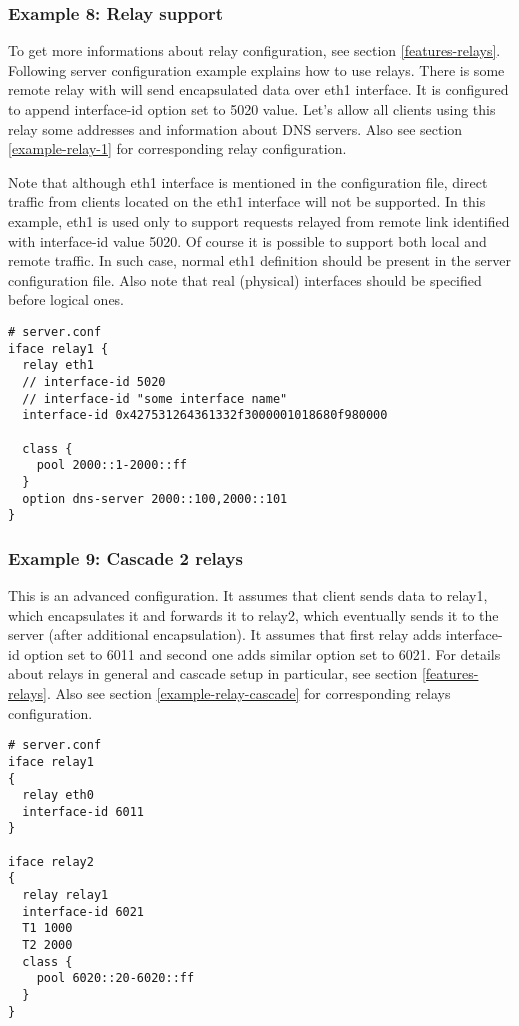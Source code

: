 \subsubsection{Example 8: Relay support}
\label{example-server-relay1}
To get more informations about relay configuration, see section \ref{features-relays}.
Following server configuration example explains how to use
relays. There is some remote relay with will send encapsulated data over
eth1 interface. It is configured to append interface-id option set to
5020 value. Let's allow all clients using this relay some addresses
and information about DNS servers. Also see section
\ref{example-relay-1} for corresponding relay configuration. 

Note that although eth1 interface is mentioned in the configuration file,
direct traffic from clients located on the eth1 interface will not be
supported. In this example, eth1 is used only to support requests
relayed from remote link identified with interface-id value 5020.
Of course it is possible to support both local and remote traffic. In
such case, normal eth1 definition should be present in the server
configuration file. Also note that real (physical) interfaces should
be specified before logical ones.

\begin{lstlisting}
# server.conf
iface relay1 {
  relay eth1
  // interface-id 5020
  // interface-id "some interface name"
  interface-id 0x427531264361332f3000001018680f980000

  class {
    pool 2000::1-2000::ff
  }
  option dns-server 2000::100,2000::101
}
\end{lstlisting}

\subsubsection{Example 9: Cascade 2 relays}
\label{example-server-relay2}
This is an advanced configuration. It assumes that client sends data to
relay1, which encapsulates it and forwards it to relay2, which
eventually sends it to the server (after additional encapsulation). It
assumes that first relay adds interface-id option set to 6011 and
second one adds similar option set to 6021. For details about relays
in general and cascade setup in particular, see section
\ref{features-relays}. Also see section \ref{example-relay-cascade}
for corresponding relays configuration.

\begin{lstlisting}
# server.conf
iface relay1
{
  relay eth0
  interface-id 6011
} 

iface relay2
{
  relay relay1
  interface-id 6021
  T1 1000
  T2 2000
  class {
    pool 6020::20-6020::ff
  }
}
\end{lstlisting}

